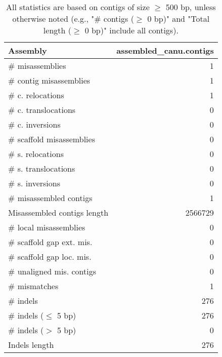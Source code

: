 \documentclass[12pt,a4paper]{article}
\begin{document}
\begin{table}[ht]
\begin{center}
\caption{All statistics are based on contigs of size $\geq$ 500 bp, unless otherwise noted (e.g., "\# contigs ($\geq$ 0 bp)" and "Total length ($\geq$ 0 bp)" include all contigs).}
\begin{tabular}{|l*{1}{|r}|}
\hline
Assembly & assembled\_canu.contigs \\ \hline
\# misassemblies & 1 \\ \hline
\hspace{2mm}\# contig misassemblies & 1 \\ \hline
\hspace{5mm}\# c. relocations & 1 \\ \hline
\hspace{5mm}\# c. translocations & 0 \\ \hline
\hspace{5mm}\# c. inversions & 0 \\ \hline
\hspace{2mm}\# scaffold misassemblies & 0 \\ \hline
\hspace{5mm}\# s. relocations & 0 \\ \hline
\hspace{5mm}\# s. translocations & 0 \\ \hline
\hspace{5mm}\# s. inversions & 0 \\ \hline
\# misassembled contigs & 1 \\ \hline
Misassembled contigs length & 2566729 \\ \hline
\# local misassemblies & 0 \\ \hline
\# scaffold gap ext. mis. & 0 \\ \hline
\# scaffold gap loc. mis. & 0 \\ \hline
\# unaligned mis. contigs & 0 \\ \hline
\# mismatches & 1 \\ \hline
\# indels & 276 \\ \hline
\hspace{5mm}\# indels ($\leq$ 5 bp) & 276 \\ \hline
\hspace{5mm}\# indels ($>$ 5 bp) & 0 \\ \hline
Indels length & 276 \\ \hline
\end{tabular}
\end{center}
\end{table}
\end{document}
